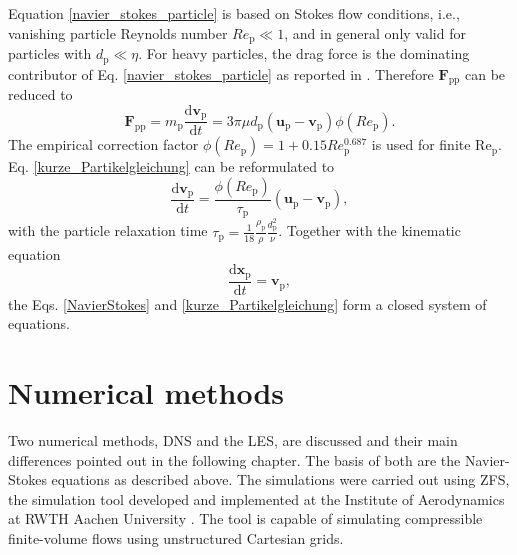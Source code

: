\documentclass[11pt,a4paper,openany,oneside,parskip=half*]{article}
\renewcommand*\vec[1]{\boldsymbol{#1}}
\begin{document}
Equation \eqref{navier_stokes_particle} is based on Stokes flow conditions, i.e., vanishing particle Reynolds number $Re_\mathrm{p} \ll 1$, and in general only valid for particles with $d_\mathrm{p} \ll \eta$.
For heavy particles, the drag force is the dominating contributor of Eq. \eqref{navier_stokes_particle} as reported in \cite{TheImportanceOfTheFocusActingOnParticlesInTurbulentFlows}. Therefore $\vec{F}_\mathrm{pp}$ can be reduced to
\begin{equation} \label{kurze_Partikelgleichung}
\vec{F}_\mathrm{pp} =  m_\mathrm{p} \frac{\mathrm{d}\vec{v}_\mathrm{p}}{\mathrm{d}t} = 3 \pi \mu d_\mathrm{p}(\vec{u}_\mathrm{p}-\vec{v}_\mathrm{p})\phi(Re_\mathrm{p}).
\end{equation}
The empirical correction factor $\phi(Re_\mathrm{p}) = 1+0.15Re_\mathrm{p}^\mathrm{0.687}$ is used for finite $\mathrm{Re_\mathrm{p}}$. \newline Eq. \eqref{kurze_Partikelgleichung} can be reformulated to
\begin{equation} \label{shortPaticleDynamics}
\frac{\mathrm{d}\vec{v}_\mathrm{p}}{\mathrm{d}t} = \frac{\phi(Re_\mathrm{p})}{\tau_\mathrm{p}}(\vec{u}_\mathrm{p}-\vec{v}_\mathrm{p}),
\end{equation}
with the particle relaxation time $\tau_\mathrm{p}=\frac{1}{18}\frac{\rho_\mathrm{p}}{\rho}\frac{d_\mathrm{p}^\mathrm{2}}{\nu}$. 
\newline
Together with the kinematic equation    
\begin{equation}
 \frac{\mathrm{d}\vec{x}_\mathrm{p}}{\mathrm{d}t} = \vec{v}_\mathrm{p},
\end{equation}
the Eqs.  \eqref{NavierStokes} and \eqref{kurze_Partikelgleichung} form a closed system of equations.
\pagebreak
\section{Numerical methods} %
Two numerical methods, DNS and the LES, are discussed and their main differences pointed out in the following chapter. The basis of both are the Navier-Stokes equations as described above. The simulations were carried out using ZFS, the simulation tool developed and implemented at the Institute of Aerodynamics at RWTH Aachen University 
\cite{anAdaptiveMultilevelMultigridFormulationForCartesianHierarchicalGridMethods, aStrictlyConservativeCartesianCutCellMethodForCompressibleViscousFlowsOnAdaptiveGrids}. 
The tool is capable of simulating compressible finite-volume flows using unstructured Cartesian grids.
\newline
\end{document}
